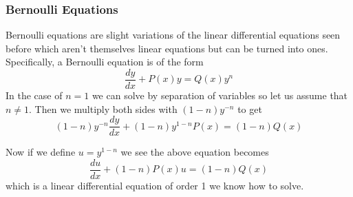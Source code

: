 \subsubsection{Bernoulli Equations}

Bernoulli equations are slight variations of the linear differential equations seen before which aren't themselves linear equations but can be turned into ones. Specifically, a Bernoulli equation is of the form
\begin{equation}\label{eq:bernoulli}
    \frac{dy}{dx} + P(x)y = Q(x) y^n
\end{equation}
In the case of $n = 1$ we can solve by separation of variables so let us assume that $n \neq 1$. Then we multiply both sides with $(1 - n)y^{-n}$ to get 
$$ (1 - n)y^{-n} \frac{dy}{dx} + (1 - n)y^{1 - n}P(x) = (1 - n)Q(x) $$

Now if we define $u = y^{1 - n}$ we see the above equation becomes
$$ \frac{du}{dx} + (1 - n)P(x) u = (1 - n)Q(x) $$
which is a linear differential equation of order 1 we know how to solve.


